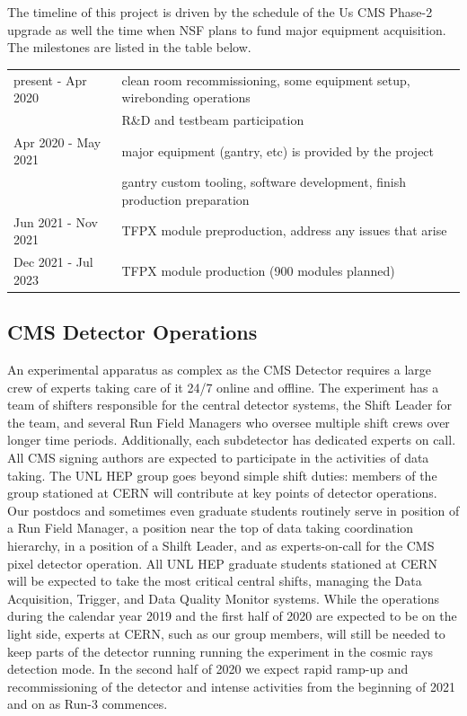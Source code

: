 The timeline of this project is driven by the schedule of the Us CMS Phase-2 upgrade as well the time when NSF plans to fund major equipment acquisition. The milestones are listed in the table below.

\vspace{3mm}
\noindent
\begin{tabular}{l|l}
\hline
present - Apr 2020 & clean room recommissioning, some equipment setup, wirebonding operations \\
        &  R\&D and testbeam participation \\
Apr 2020 - May 2021 
         & major equipment (gantry, etc) is provided by the project \\
         & gantry custom tooling, software development, finish production preparation \\
Jun 2021 - Nov 2021
         & TFPX module preproduction, address any issues that arise \\
Dec 2021 - Jul 2023 
         &  TFPX module production (900 modules planned) \\
\hline
\end{tabular}

\subsection{CMS Detector Operations}
An experimental apparatus as complex as the CMS Detector requires a large crew of experts taking care of it 24/7 online and offline. The experiment has a team of shifters responsible for the central detector systems, the Shift Leader for the team, and several Run Field Managers who oversee multiple shift crews over longer time periods. Additionally, each subdetector has dedicated experts on call. All CMS signing authors are expected to participate in the activities of data taking. The UNL HEP group goes beyond simple shift duties: members of the group stationed at CERN will contribute at key points of detector operations.  Our postdocs and sometimes even graduate students routinely serve in position of a Run Field Manager, a position near the top of data taking coordination hierarchy, in a position of a Shilft Leader, and as experts-on-call for the CMS pixel detector operation. All UNL HEP graduate students stationed at CERN will be expected to take the most critical central shifts, managing the Data Acquisition, Trigger, and Data Quality Monitor systems. While the operations during the calendar year 2019 and the first half of 2020 are expected to be on the light side, experts at CERN, such as our group members, will still be needed to keep parts of the detector running running the experiment in the cosmic rays detection mode. In the second half of 2020 we expect rapid ramp-up and recommissioning of the detector and intense activities from the beginning of 2021 and on as Run-3 commences. 
